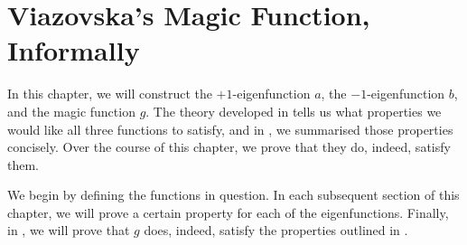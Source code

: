 \chapter{Viazovska's Magic Function, Informally}
\label{Ch4:Chapter}

In this chapter, we will construct the $+1$-eigenfunction $a$, the $-1$-eigenfunction $b$, and the magic function $g$. The theory developed in  tells us what properties we would like all three functions to satisfy, and in , we summarised those properties concisely. Over the course of this chapter, we prove that they do, indeed, satisfy them.

We begin by defining the functions in question. In each subsequent section of this chapter, we will prove a certain property for each of the eigenfunctions. Finally, in , we will prove that $g$ does, indeed, satisfy the properties outlined in .





